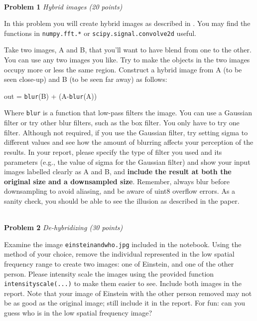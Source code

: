 \documentclass[11pt]{article}
\newcommand{\hwproblem}[2] {\noindent \\ {\bf #1} {\it #2}}
\begin{document}
\vspace{0.2cm}

\newpage 




\hwproblem{Problem 1}{Hybrid images (20 points) }

In this problem you will create hybrid images as described in
\cite{oliva2006hybrid}. You may find the functions in \texttt{numpy.fft.*} or \texttt{scipy.signal.convolve2d} useful.

Take two images, A and B, that you'll want to have blend from one to the other. You can use any two images you like. Try to make the objects in the two images occupy more or less the same region. Construct a hybrid image from A (to be seen
close-up) and B (to be seen far away) as follows:
\begin{center}
out =  \texttt{blur}(B) + (A-\texttt{blur}(A))
\end{center}

Where \texttt{blur} is a function that low-pass filters the image. You can use a Gaussian filter or try other blur filters, such as the box filter. You only have to try one filter. Although not required, if you use the Gaussian filter, try setting sigma to different values and see how the amount of blurring affects your perception of the results. In your report, please specify the type of filter you used and its parameters (e.g., the value of sigma for the Gaussian filter) and show your input images labelled clearly as A and B, and \textbf{include the result at both the original size and a downsampled size}. Remember, always blur before downsampling to avoid aliasing, and be aware of uint8 overflow errors. As a sanity check, you should be able to see the illusion as described in the paper.

\hwproblem{Problem 2}{De-hybridizing (30 points)}

Examine the image \texttt{einsteinandwho.jpg} included in the notebook. Using the method of your choice, remove the individual represented in the low spatial frequency range to create two images: one of Einstein, and one of the other person. Please intensity scale the images using the provided function \texttt{intensityscale(...)} to make them easier to see. Include both images in the report. Note that your image of Einstein with the other person removed may not be as good as the original image; still include it in the report. For fun: can you guess who is in the low spatial frequency image?
\end{document}
